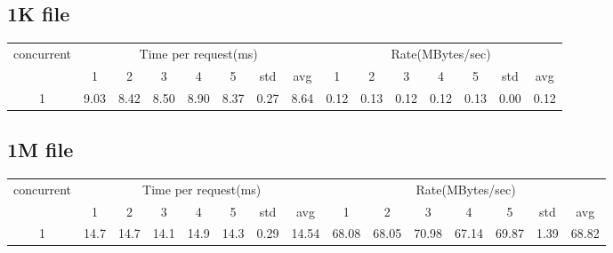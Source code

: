 \documentclass{article}
\begin{document}
\subsection*{1K file}
\begin{table}[H]
    \begin{tabular}{|c|c|c|c|c|c|c|c|c|c|c|c|c|c|c|}
        \hline
        \multirow{2}{*}{concurrent} & \multicolumn{7}{c|}{Time per request(ms)} & \multicolumn{7}{c|}{Rate(MBytes/sec)}                                                                                     \\ \cline{2-15}
                                    & 1                                         & 2                                     & 3    & 4    & 5    & std  & avg  & 1    & 2    & 3    & 4    & 5    & std  & avg  \\ \hline
        1                           & 9.03                                      & 8.42                                  & 8.50 & 8.90 & 8.37 & 0.27 & 8.64 & 0.12 & 0.13 & 0.12 & 0.12 & 0.13 & 0.00 & 0.12 \\ \hline
    \end{tabular}
\end{table}
\subsection*{1M file}
\begin{table}[H]
    \begin{tabular}{|c|c|c|c|c|c|c|c|c|c|c|c|c|c|c|}
        \hline
        \multirow{2}{*}{concurrent} & \multicolumn{7}{c|}{Time per request(ms)} & \multicolumn{7}{c|}{Rate(MBytes/sec)}                                                                                            \\ \cline{2-15}
                                    & 1                                         & 2                                     & 3    & 4    & 5    & std  & avg   & 1     & 2     & 3     & 4     & 5     & std  & avg   \\ \hline
        1                           & 14.7                                      & 14.7                                  & 14.1 & 14.9 & 14.3 & 0.29 & 14.54 & 68.08 & 68.05 & 70.98 & 67.14 & 69.87 & 1.39 & 68.82 \\ \hline
    \end{tabular}
\end{table}
\end{document}
